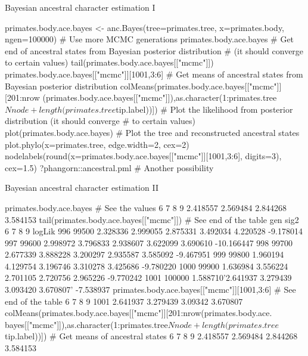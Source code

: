 \documentclass[compress, ucs, xelatex, 11pt, xcolor=svgnames,
  hyperref={
    bookmarks=true,
    unicode=true,
    colorlinks=true,
    pdftitle={Molecular data in R},
    plainpages=false,
    pdfauthor={Vojtech Zeisek},
    pdfsubject={Course about phylogeny and evolution in R},
    pdfcreator={XeLaTeX},
    pdfkeywords={R, evolution, phylogeny, molecular data},
    linkcolor=Tomato,
    anchorcolor=SaddleBrown,
    citecolor=Goldenrod,
    filecolor=DarkMagenta,
    menucolor=Sienna,
    urlcolor=DarkTurquoise,
    pdftex},
  url={hyphens, lowtilde} %
  ]{beamer}
\begin{document}
\begin{frame}[fragile]{Bayesian ancestral character estimation I}
  \begin{spluscode}
    primates.body.ace.bayes <- anc.Bayes(tree=primates.tree,
      x=primates.body, ngen=100000) # Use more MCMC generations
    primates.body.ace.bayes
    # Get end of ancestral states from Bayesian posterior distribution
    # (it should converge to certain values)
    tail(primates.body.ace.bayes[["mcmc"]])
    primates.body.ace.bayes[["mcmc"]][1001,3:6]
    # Get means of ancestral states from Bayesian posterior distribution
    colMeans(primates.body.ace.bayes[["mcmc"]][201:nrow
      (primates.body.ace.bayes[["mcmc"]]),as.character(1:primates.tree
      $Nnode+length(primates.tree$tip.label))])
    # Plot the likelihood from posterior distribution (it should converge
    # to certain values)
    plot(primates.body.ace.bayes)
    # Plot the tree and reconstructed ancestral states
    plot.phylo(x=primates.tree, edge.width=2, cex=2)
    nodelabels(round(x=primates.body.ace.bayes[["mcmc"]][1001,3:6],
      digits=3), cex=1.5)
    ?phangorn::ancestral.pml # Another possibility
  \end{spluscode}
\end{frame}

\begin{frame}[fragile]{Bayesian ancestral character estimation II}
  \begin{spluscode}
    primates.body.ace.bayes # See the values
           6        7        8        9
    2.418557 2.569484 2.844268 3.584153
    tail(primates.body.ace.bayes[["mcmc"]]) # See end of the table
            gen     sig2        6        7        8        9     logLik
    996   99500 2.328336 2.999055 2.875331 3.492034 4.220528  -9.178014
    997   99600 2.998972 3.796833 2.938607 3.622099 3.690610 -10.166447
    998   99700 2.677339 3.888228 3.200297 2.935587 3.585092  -9.467951
    999   99800 1.960194 4.129754 3.196746 3.310278 3.425686  -9.780220
    1000  99900 1.636984 3.556224 2.701105 2.720756 2.965226  -9.770242
    1001 100000 1.588710'2.641937 3.279439 3.093420 3.670807' -7.538937
    primates.body.ace.bayes[["mcmc"]][1001,3:6] # See end of the table
                6        7       8        9
    1001 2.641937 3.279439 3.09342 3.670807
    colMeans(primates.body.ace.bayes[["mcmc"]][201:nrow(primates.body.ace.
      bayes[["mcmc"]]),as.character(1:primates.tree$Nnode+length
      (primates.tree$tip.label))]) # Get means of ancestral states
           6        7        8        9
    2.418557 2.569484 2.844268 3.584153
  \end{spluscode}
\end{frame}
\end{document}
